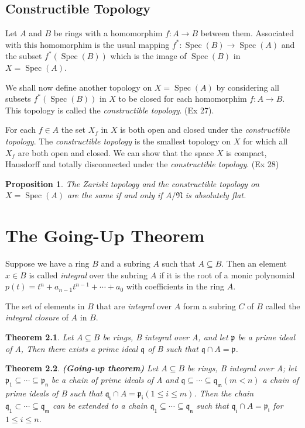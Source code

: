 \documentclass[]{report}
\newtheorem{theorem}{Theorem}[section]
\newtheorem{prop}[theorem]{Proposition}
\DeclareMathOperator\Spec{Spec}
\newcommand\mfk[1]{\mathfrak{#1}}
\begin{document}
\section{Constructible Topology}

Let $A$ and $B$ be rings with a homomorphim $f: A \rightarrow B$ between them. Associated with this homomorphim is the usual mapping $f^*: \Spec(B) \rightarrow \Spec(A)$ and the subset $f^*(\Spec(B))$ which is the image of $\Spec(B)$ in $X = \Spec(A)$.

We shall now define another topology on $X = \Spec(A)$ by considering all subsets $f^*(\Spec(B))$ in $X$ to be closed for each homomorphim $f: A \rightarrow B$. This topology is called the \textit{constructible topology}. (Ex 27).

For each $f \in A$ the set $X_f$ in $X$ is both open and closed under the \textit{constructible topology}. The \textit{constructible topology} is the smallest topology on $X$ for which all $X_f$ are both open and closed. We can show that the space $X$ is compact, Hausdorff and totally disconnected under the \textit{constructible topology}. (Ex 28)

\begin{prop}
    The Zariski topology and the constructible topology on $X = \Spec(A)$ are the same if and only if $A/\mfk{N}$ is \textit{absolutely flat}.
\end{prop}


\chapter{The Going-Up Theorem}

Suppose we have a ring $B$ and a subring $A$ such that $A \subseteq B$. Then an element $x \in B$ is called \textit{integral} over the subring $A$ if it is the root of a monic polynomial $p(t) = t^n + a_{n-1}t^{n-1} + \cdots + a_0$ with coefficients in the ring $A$.

The set of elements in $B$ that are \textit{integral} over $A$ form a subring $C$ of $B$ called the \textit{integral closure} of $A$ in $B$.

\begin{theorem}
    Let $A\subseteq B$ be rings, B integral over A, and let $\mathfrak{p}$ be a prime ideal of A, Then there exists a prime ideal $\mathfrak{q}$ of B such that $\mathfrak{q}\cap A = \mathfrak{p}$. 
\end{theorem}

\begin{theorem}
    \textbf{(Going-up theorem)} Let $A \subseteq B$ be rings, B integral over A; let $\mathfrak{p_1 \subseteq \cdots \subseteq p_n}$ be a chain of prime ideals of A and $\mathfrak{q \subseteq \cdots \subseteq q_m} (m < n )$ a chain of prime ideals of B such that $\mathfrak{q_i} \cap A = \mathfrak{p_i} (1 \leq i \leq m)$. Then the chain $\mathfrak{q_1 \subset \cdots \subseteq q_m}$ can be extended to a chain $\mathfrak{q_1 \subseteq \cdots \subseteq q_n}$ such that $\mathfrak{q_i} \cap A = \mathfrak{p_i}$ for $1 \leq i \leq n$.
\end{theorem}
\end{document}
